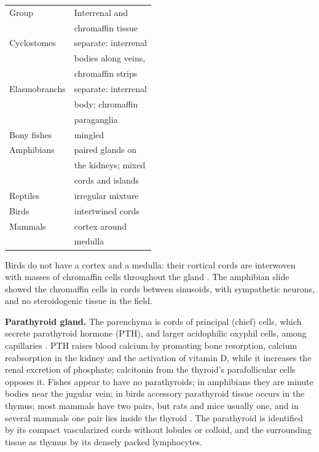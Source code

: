 \begin{center}
\begin{tabular}{ll}
Group & Interrenal and \\
& chromaffin tissue \\
\hline
Cyclostomes & separate: interrenal \\
& bodies along veins, \\
& chromaffin strips \\
Elasmobranchs & separate: interrenal \\
& body; chromaffin \\
& paraganglia \\
Bony fishes & mingled \\
Amphibians & paired glands on \\
& the kidneys; mixed \\
& cords and islands \\
Reptiles & irregular mixture \\
Birds & intertwined cords \\
Mammals & cortex around \\
& medulla \\
\end{tabular}
\end{center}

Birds do not have a cortex and a medulla:
their cortical cords are interwoven with
masses of chromaffin cells throughout the
gland \cite[Chapter 16]{bacha2000veterinary}.
The amphibian slide showed the
chromaffin cells in cords between sinusoids,
with sympathetic neurons, and no
steroidogenic tissue in the field.

\textbf{Parathyroid gland.} The parenchyma is
cords of principal (chief) cells, which
secrete parathyroid hormone (PTH), and larger
acidophilic oxyphil cells, among capillaries
\cite[Chapter 21]{ross2011histology}. PTH
raises blood calcium by promoting bone
resorption, calcium reabsorption in the
kidney and the activation of vitamin D, while
it increases the renal excretion of
phosphate; calcitonin from the thyroid's
parafollicular cells opposes it. Fishes
appear to have no parathyroids; in amphibians
they are minute bodies near the jugular vein;
in birds accessory parathyroid tissue occurs
in the thymus; most mammals have two pairs,
but rats and mice usually one, and in several
mammals one pair lies inside the thyroid
\cite[Chapter 13]{andrew1959comparative}.
The parathyroid is identified by its
compact vascularized cords without lobules or
colloid, and the surrounding tissue as thymus
by its densely packed lymphocytes.

